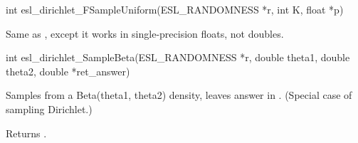\begin{sreapi}
\hypertarget{func:esl_dirichlet_FSampleUniform()}
{\item[int esl\_dirichlet\_FSampleUniform(ESL\_RANDOMNESS *r, int K, float *p)]}

Same as , except it
works in single-precision floats, not doubles.


\hypertarget{func:esl_dirichlet_SampleBeta()}
{\item[int esl\_dirichlet\_SampleBeta(ESL\_RANDOMNESS *r, double theta1, double theta2, double *ret\_answer)]}

Samples from a Beta(theta1, theta2) density, leaves answer
in . (Special case of sampling Dirichlet.)

Returns .           


\end{sreapi}


